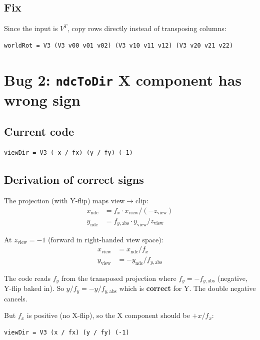 \documentclass{article}
\begin{document}
\subsection{Fix}

Since the input is $V^T$, copy rows directly instead of transposing columns:

\begin{verbatim}
worldRot = V3 (V3 v00 v01 v02) (V3 v10 v11 v12) (V3 v20 v21 v22)
\end{verbatim}

\section{Bug 2: \texttt{ndcToDir} X component has wrong sign}

\subsection{Current code}
\begin{verbatim}
viewDir = V3 (-x / fx) (y / fy) (-1)
\end{verbatim}

\subsection{Derivation of correct signs}

The projection (with Y-flip) maps view$\to$clip:
\begin{align*}
x_\text{ndc} &= f_x \cdot x_\text{view} / (-z_\text{view}) \\
y_\text{ndc} &= f_{y,\text{abs}} \cdot y_\text{view} / z_\text{view}
\end{align*}

At $z_\text{view} = -1$ (forward in right-handed view space):
\begin{align*}
x_\text{view} &= x_\text{ndc} / f_x \\
y_\text{view} &= -y_\text{ndc} / f_{y,\text{abs}}
\end{align*}

The code reads $f_y$ from the transposed projection where $f_y = -f_{y,\text{abs}}$
(negative, Y-flip baked in). So $y / f_y = -y / f_{y,\text{abs}}$ which is
\textbf{correct} for Y. The double negative cancels.

But $f_x$ is positive (no X-flip), so the X component should be $+x / f_x$:
\begin{verbatim}
viewDir = V3 (x / fx) (y / fy) (-1)
\end{verbatim}
\end{document}
